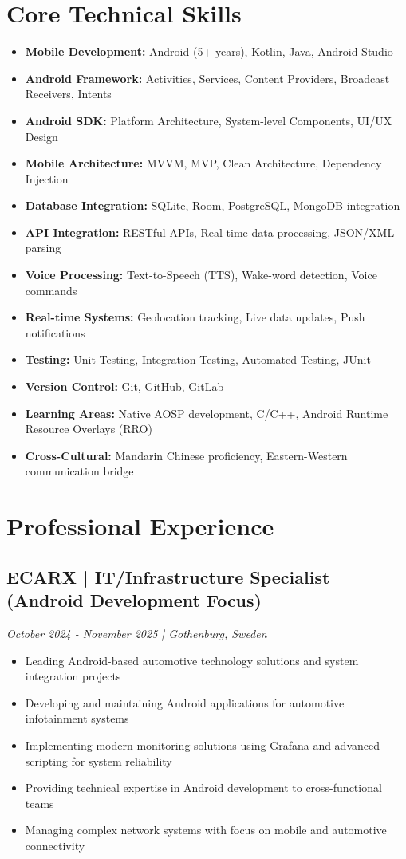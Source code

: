 \documentclass[11pt,a4paper]{article}
\begin{document}
\section*{Core Technical Skills}
\begin{itemize}[noitemsep]
\item \textbf{Mobile Development:} Android (5+ years), Kotlin, Java, Android Studio
\item \textbf{Android Framework:} Activities, Services, Content Providers, Broadcast Receivers, Intents
\item \textbf{Android SDK:} Platform Architecture, System-level Components, UI/UX Design
\item \textbf{Mobile Architecture:} MVVM, MVP, Clean Architecture, Dependency Injection
\item \textbf{Database Integration:} SQLite, Room, PostgreSQL, MongoDB integration
\item \textbf{API Integration:} RESTful APIs, Real-time data processing, JSON/XML parsing
\item \textbf{Voice Processing:} Text-to-Speech (TTS), Wake-word detection, Voice commands
\item \textbf{Real-time Systems:} Geolocation tracking, Live data updates, Push notifications
\item \textbf{Testing:} Unit Testing, Integration Testing, Automated Testing, JUnit
\item \textbf{Version Control:} Git, GitHub, GitLab
\item \textbf{Learning Areas:} Native AOSP development, C/C++, Android Runtime Resource Overlays (RRO)
\item \textbf{Cross-Cultural:} Mandarin Chinese proficiency, Eastern-Western communication bridge
\end{itemize}

\section*{Professional Experience}
\subsection*{ECARX | IT/Infrastructure Specialist (Android Development Focus)}
\textit{October 2024 - November 2025 | Gothenburg, Sweden}
\begin{itemize}[noitemsep]
\item Leading Android-based automotive technology solutions and system integration projects
\item Developing and maintaining Android applications for automotive infotainment systems
\item Implementing modern monitoring solutions using Grafana and advanced scripting for system reliability
\item Providing technical expertise in Android development to cross-functional teams
\item Managing complex network systems with focus on mobile and automotive connectivity
\end{itemize}
\end{document}
